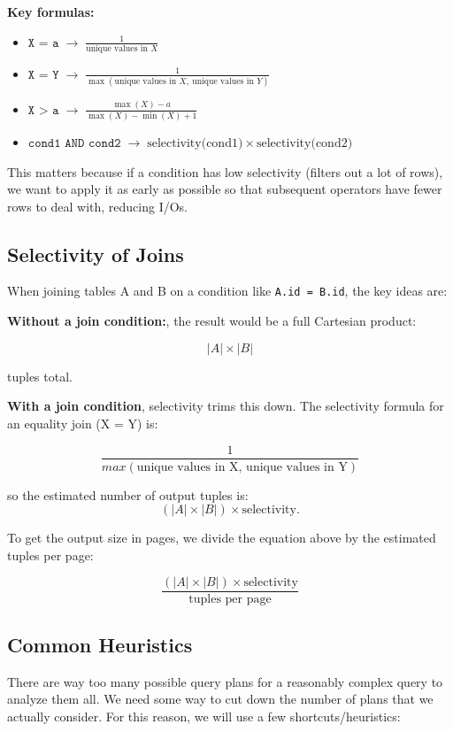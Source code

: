 \documentclass{article}
\begin{document}
\textbf{Key formulas:}
\begin{itemize}
    \item $\texttt{X = a} \;\rightarrow\; \frac{1}{\text{unique values in } X}$
    
    \item $\texttt{X = Y} \;\rightarrow\; \frac{1}{\max(\text{unique values in } X,\ \text{unique values in } Y)}$
    
    \item $\texttt{X > a} \;\rightarrow\; \frac{\max(X) - a}{\max(X) - \min(X) + 1}$
   
    \item $\texttt{cond1 AND cond2} \;\rightarrow\; \text{selectivity(cond1)} \times \text{selectivity(cond2)}$
\end{itemize}

This matters because if a condition has low selectivity (filters out a lot of rows), we want to apply it as early as possible so that subsequent operators have fewer rows to deal with, reducing I/Os.

\subsection{Selectivity of Joins}
When joining tables A and B on a condition like \texttt{A.id = B.id}, the key ideas are:

\textbf{Without a join condition:}, the result would be a full Cartesian product:

\[
|A| \times |B|
\]

tuples total.

\textbf{With a join condition}, selectivity trims this down. The selectivity formula for an equality join (X = Y) is:

\[
\frac{1}{max(\text{unique values in X, unique values in Y})}
\]

so the estimated number of output tuples is:
\[
(|A| \times |B|) \times \text{selectivity}.
\]

To get the output size in pages, we divide the equation above by the estimated tuples per page:

\[
\frac{(|A| \times |B|) \times \text{selectivity}}{\text{tuples per page}}
\]

\subsection{Common Heuristics}

There are way too many possible query plans for a reasonably complex query to analyze them all. We need some way to cut down the number of plans that we actually consider. For this reason, we will use a few shortcuts/heuristics:
\end{document}
